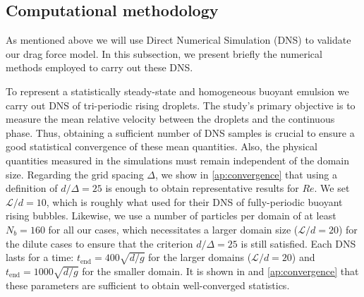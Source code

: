 \subsection{Computational methodology}

As mentioned above we will use Direct Numerical Simulation (DNS) to validate our drag force model. 
In this subsection, we present briefly the numerical methods employed to carry out these DNS. 

To represent a statistically steady-state and homogeneous buoyant emulsion we carry out DNS of tri-periodic rising droplets. 
The study's primary objective is to measure the mean relative velocity between the droplets and the continuous phase.
Thus, obtaining a sufficient number of DNS samples is crucial to ensure a good statistical convergence of these mean quantities. 
Also, the physical quantities measured in the simulations must remain independent of the domain size. 
Regarding the grid spacing $\Delta$, we show in \ref{ap:convergence} that using a definition of $d/\Delta = 25$ is enough to obtain representative results for $Re$. 
We set $\mathcal{L}/d = 10$, which is roughly what \citet{hidman2023assessing} used for their DNS of fully-periodic buoyant rising bubbles.
Likewise, we use a number of particles per domain of at least $N_b = 160$ for all our cases, which necessitates a larger domain size ($\mathcal{L}/d = 20$) for the dilute cases to ensure that the criterion  $d/\Delta = 25$ is still satisfied. 
Each DNS lasts for a time: $t_\text{end} = 400 \sqrt{d/g}$ for the larger domains ($\mathcal{L}/d=20$) and $t_\text{end} = 1000 \sqrt{d/g}$ for the smaller domain.
It is shown in \citet{fintzi2024buoyancy} and \ref{ap:convergence} that these parameters are sufficient to obtain well-converged statistics. 



